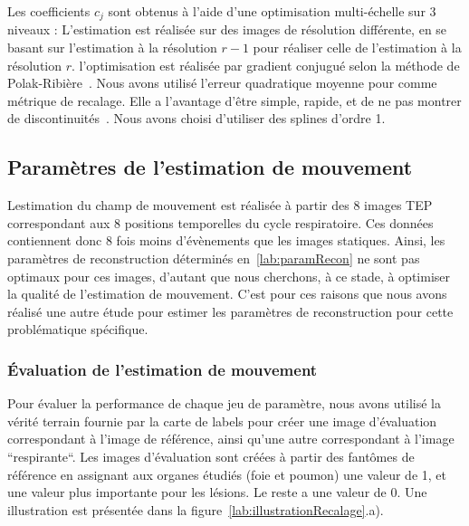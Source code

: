 Les coefficients $c_j$ sont obtenus à l'aide d'une optimisation multi-échelle sur 3 niveaux : L'estimation est réalisée sur des images de résolution différente, en se basant sur l'estimation à la résolution $r-1$ pour réaliser celle de l'estimation à la résolution $r$. l'optimisation est réalisée par gradient conjugué selon la méthode de Polak-Ribière~\cite{polak1969note}. Nous avons utilisé l'erreur quadratique moyenne pour comme métrique de recalage. Elle a l'avantage d'être simple, rapide, et de ne pas montrer de discontinuités~\cite{ledesma2005spatio}. Nous avons choisi d'utiliser des splines d'ordre 1.


\subsection{Paramètres de l'estimation de mouvement}


Lestimation du champ de mouvement est réalisée à partir des 8 images TEP correspondant aux 8 positions temporelles du cycle respiratoire. Ces données contiennent donc 8 fois moins d'évènements que les images statiques. Ainsi, les paramètres de reconstruction déterminés en~\ref{lab:paramRecon} ne sont pas optimaux pour ces images, d'autant que nous cherchons, à ce stade, à optimiser la qualité de l'estimation de mouvement. C'est pour ces raisons que nous avons réalisé une autre étude pour estimer les paramètres de reconstruction pour cette problématique spécifique. 


\subsubsection{\'Evaluation de l'estimation de mouvement}

Pour évaluer la performance de chaque jeu de paramètre, nous avons utilisé la vérité terrain fournie par la carte de labels pour créer une image d'évaluation correspondant à l'image de référence, ainsi qu'une autre correspondant à l'image ``respirante``. Les images d'évaluation sont créées à partir des fantômes de référence en assignant aux organes étudiés (foie et poumon) une valeur de 1, et une valeur plus importante pour les lésions. Le reste a une valeur de 0. Une illustration est présentée dans la figure~\ref{lab:illustrationRecalage}.a). 

